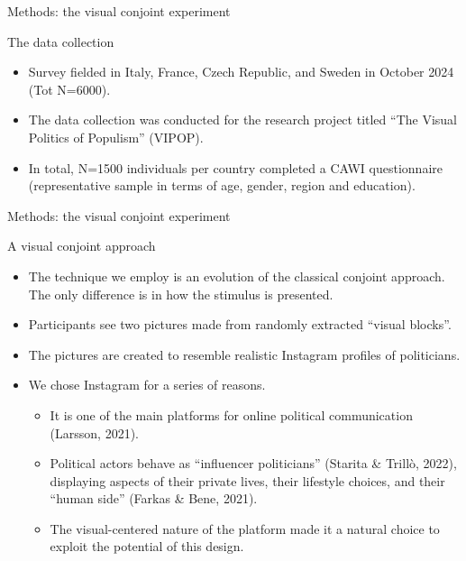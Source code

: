 \documentclass[
  ignorenonframetext,
]{beamer}
\providecommand{\tightlist}{%
  \setlength{\itemsep}{0pt}\setlength{\parskip}{0pt}}
\begin{document}
\begin{frame}{Methods: the visual conjoint experiment}
\label{methods-the-visual-conjoint-experiment}
\begin{block}{The data collection}
\label{the-data-collection}
\begin{itemize}
\tightlist
\item
  Survey fielded in Italy, France, Czech Republic, and Sweden in October
  2024 (Tot N=6000).
\item
  The data collection was conducted for the research project titled
  ``The Visual Politics of Populism'' (VIPOP).
\item
  In total, N=1500 individuals per country completed a CAWI
  questionnaire (representative sample in terms of age, gender, region
  and education).
\end{itemize}
\end{block}
\end{frame}

\begin{frame}{Methods: the visual conjoint experiment}
\label{methods-the-visual-conjoint-experiment-1}
\begin{block}{A visual conjoint approach}
\label{a-visual-conjoint-approach}
\begin{itemize}
\tightlist
\item
  The technique we employ is an evolution of the classical conjoint
  approach. The only difference is in how the stimulus is presented.
\item
  Participants see two pictures made from randomly extracted ``visual
  blocks''.
\item
  The pictures are created to resemble realistic Instagram profiles of
  politicians.
\item
  We chose Instagram for a series of reasons.

  \begin{itemize}
  \item
    It is one of the main platforms for online political communication
    (Larsson, 2021).
  \item
    Political actors behave as ``influencer politicians'' (Starita \&
    Trillò, 2022), displaying aspects of their private lives, their
    lifestyle choices, and their ``human side'' (Farkas \& Bene, 2021).
  \item
    The visual-centered nature of the platform made it a natural choice
    to exploit the potential of this design.
  \end{itemize}
\end{itemize}
\end{block}
\end{frame}
\end{document}
